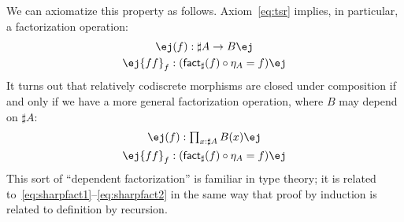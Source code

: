 \documentclass[copyright,12pt]{eptcs}
\makeatletter
\newcommand{\factsharp}{\textsf{fact}_{\sharp}}
\def\jd#1{\@jd#1\ej}
\def\@jd#1|-#2\ej{\@@jd#1,,\;\vdash\;\left(#2\right)}
\def\@@jd#1,{\@ifmtarg{#1}{\let\next=\relax}{\left(#1\right)\let\next=\@@@jd}\next}
\def\@@@jd#1,{\@ifmtarg{#1}{\let\next=\relax}{,\,\left(#1\right)\let\next=\@@@jd}\next}
\makeatother
\begin{document}
We can axiomatize this property as follows.
Axiom~\eqref{eq:tsr} implies, in particular, a factorization operation:
\begin{gather}
  \jd{\mathsf{bc}:\mathsf{isCodisc}(B), f:A\to B |- \factsharp(f):\sharp A \to B} \label{eq:sharpfact1} \\
  \jd{\mathsf{bc}:\mathsf{isCodisc}(B), f:A\to B |- \mathsf{ff}_f:(\factsharp(f) \circ \eta_A = f)}\label{eq:sharpfact2}
\end{gather}
It turns out that relatively codiscrete morphisms are closed under composition if and only if we have a more general factorization operation, where $B$ may depend on $\sharp A$:
\begin{gather}
  \jd{ \mathsf{bc}:\textstyle\prod_{x:\sharp A}\mathsf{isCodisc}(B(x)),
    f:\textstyle\prod_{x:A} B(\eta_A(x))
    |- \factsharp(f):\textstyle\prod_{x:\sharp A} B(x)} \\
  \jd{ \mathsf{bc}:\textstyle\prod_{x:\sharp A}\mathsf{isCodisc}(B(x)),
    f:\textstyle\prod_{x:A} B(\eta_A(x))
    |- \mathsf{ff}_f: (\factsharp(f) \circ \eta_A = f)}
\end{gather}
This sort of ``dependent factorization'' is familiar in type theory;
it is related to~\eqref{eq:sharpfact1}--\eqref{eq:sharpfact2} in the same way that proof by induction is related to definition by recursion.
\end{document}
